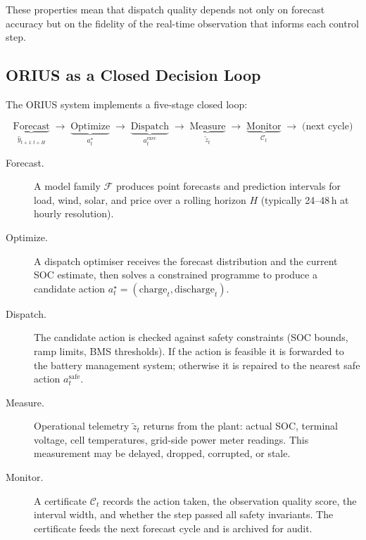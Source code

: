 These properties mean that dispatch quality depends not only on forecast
accuracy but on the fidelity of the real-time observation that informs each
control step.

\subsection{ORIUS as a Closed Decision Loop}

The ORIUS system implements a five-stage closed loop:

\[
  \underbrace{\text{Forecast}}_{\hat{y}_{t+1:t+H}}
  \;\longrightarrow\;
  \underbrace{\text{Optimize}}_{a_t^\star}
  \;\longrightarrow\;
  \underbrace{\text{Dispatch}}_{a_t^{\mathrm{exec}}}
  \;\longrightarrow\;
  \underbrace{\text{Measure}}_{\tilde{z}_t}
  \;\longrightarrow\;
  \underbrace{\text{Monitor}}_{\mathcal{C}_t}
  \;\longrightarrow\;
  \text{(next cycle)}
\]

\begin{description}
  \item[Forecast.]  A model family $\mathcal{F}$ produces point forecasts and
    prediction intervals for load, wind, solar, and price over a rolling
    horizon $H$ (typically 24--48\,h at hourly resolution).

  \item[Optimize.]  A dispatch optimiser receives the forecast distribution
    and the current SOC estimate, then solves a constrained programme to
    produce a candidate action $a_t^\star = (\text{charge}_t,
    \text{discharge}_t)$.

  \item[Dispatch.]  The candidate action is checked against safety constraints
    (SOC bounds, ramp limits, BMS thresholds).  If the action is feasible it
    is forwarded to the battery management system; otherwise it is repaired to
    the nearest safe action $a_t^{\mathrm{safe}}$.

  \item[Measure.]  Operational telemetry $\tilde{z}_t$ returns from the plant:
    actual SOC, terminal voltage, cell temperatures, grid-side power meter
    readings.  This measurement may be delayed, dropped, corrupted, or stale.

  \item[Monitor.]  A certificate $\mathcal{C}_t$ records the action taken, the
    observation quality score, the interval width, and whether the step passed
    all safety invariants.  The certificate feeds the next forecast cycle and
    is archived for audit.
\end{description}

